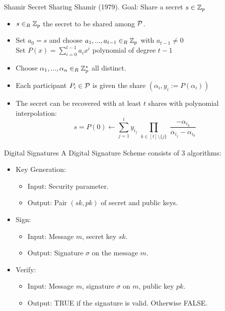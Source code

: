 \begin{frame}{Shamir Secret Sharing}
Shamir (1979). Goal: Share a secret $s \in {\mathbb Z}_p$

\begin{itemize}
\item $s \in_R {\mathbb Z}_p$ the secret to be shared among ${\mathcal P}$.
\item Set $a_0 = s$ and choose $a_1, ... , a_{t-1} \in_R {\mathbb Z}_p$ with $a_{t-1} \neq 0$ \\
        Set $P(x) = \sum_{i=0}^{t-1} a_i x^i$ polynomial of degree $t-1$
\item Choose $\alpha_1, ..., \alpha_n \in_R {\mathbb Z}_p^\ast$ all distinct.
\item Each participant $P_i \in {\mathcal P}$ is given the share $(\alpha_i, y_i := P(\alpha_i))$
\item The secret can be recovered with at least $t$ shares with polynomial interpolation:
$$ s = P(0) \leftarrow \sum_{j=1}^t y_{i_j} \prod_{\substack{k \in [t] \setminus \{j\}}} \frac{-\alpha_{i_k}}{\alpha_{i_j}-\alpha_{i_k}}$$
\end{itemize}


\end{frame}

\begin{frame}{Digital Signatures}
A Digital Signature Scheme consists of 3 algorithms:
\begin{itemize}
\item Key Generation:
	\begin{itemize}
	    \item Input: Security parameter.
	    \item Output: Pair $(sk,pk)$ of secret and public keys.
	\end{itemize}
\item Sign:
	\begin{itemize}
	    \item Input: Message $m$, secret key $sk$.
	    \item Output: Signature $\sigma$ on the message $m$.
	\end{itemize}
\item Verify:
	\begin{itemize}
	    \item Input: Message $m$, signature $\sigma$ on $m$, public key $pk$.
	    \item Output: TRUE if the signature is valid. Otherwise FALSE.
	\end{itemize}
\end{itemize}
\end{frame}

